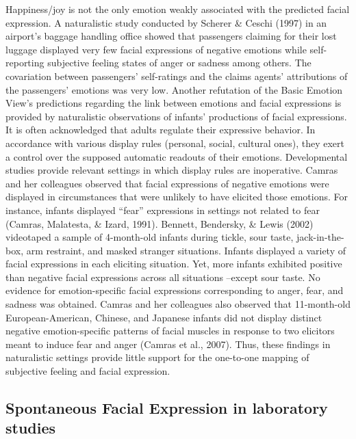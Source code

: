 \documentclass[man]{apa6}
\begin{document}
Happiness/joy is not the only emotion weakly associated with the predicted facial expression. A naturalistic study conducted by Scherer \& Ceschi (1997) in an airport's baggage handling office showed that passengers claiming for their lost luggage displayed very few facial expressions of negative emotions while self-reporting subjective feeling states of anger or sadness among others. The covariation between passengers' self-ratings and the claims agents' attributions of the passengers' emotions was very low. Another refutation of the Basic Emotion View's predictions regarding the link between emotions and facial expressions is provided by naturalistic observations of infants' productions of facial expressions. It is often acknowledged that adults regulate their expressive behavior. In accordance with various display rules (personal, social, cultural ones), they exert a control over the supposed automatic readouts of their emotions. Developmental studies provide relevant settings in which display rules are inoperative. Camras and her colleagues observed that facial expressions of negative emotions were displayed in circumstances that were unlikely to have elicited those emotions. For instance, infants displayed \enquote{fear} expressions in settings not related to fear (Camras, Malatesta, \& Izard, 1991). Bennett, Bendersky, \& Lewis (2002) videotaped a sample of 4-month-old infants during tickle, sour taste, jack-in-the-box, arm restraint, and masked stranger situations. Infants displayed a variety of facial expressions in each eliciting situation. Yet, more infants exhibited positive than negative facial expressions across all situations --except sour taste. No evidence for emotion-specific facial expressions corresponding to anger, fear, and sadness was obtained. Camras and her colleagues also observed that 11-month-old European-American, Chinese, and Japanese infants did not display distinct negative emotion-specific patterns of facial muscles in response to two elicitors meant to induce fear and anger (Camras et al., 2007). Thus, these findings in naturalistic settings provide little support for the one-to-one mapping of subjective feeling and facial expression.

\hypertarget{spontaneous-facial-expression-in-laboratory-studies}{%
\subsection{Spontaneous Facial Expression in laboratory studies}\label{spontaneous-facial-expression-in-laboratory-studies}}
\end{document}
